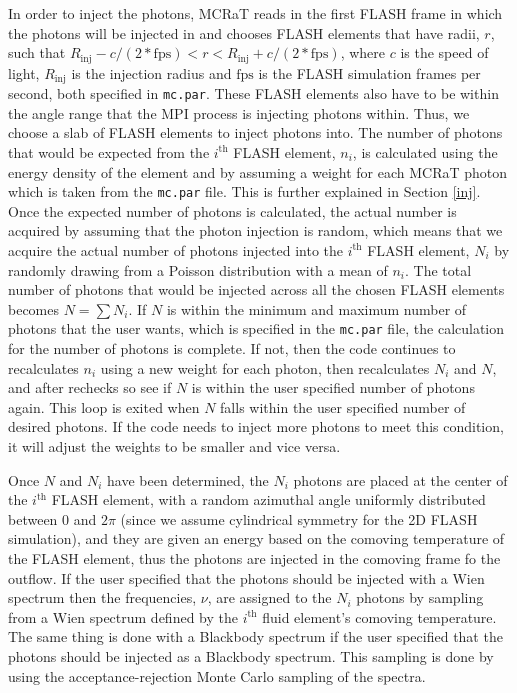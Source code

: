 \documentclass[12pt,a4paper]{article}
\begin{document}
In order to inject the photons, MCRaT reads in the first FLASH frame in which the photons will be injected in and chooses FLASH elements that have radii, $r$, such that $R_\mathrm{inj}-c/(2*\mathrm{fps}) < r < R_\mathrm{inj}+c/(2*\mathrm{fps})$, where $c$ is the speed of light, $R_\mathrm{inj}$ is the injection radius and $\mathrm{fps}$ is the FLASH simulation frames per second, both specified in \texttt{mc.par}. These FLASH elements also have to be within the angle range that the MPI process is injecting photons within. Thus, we choose a slab of FLASH elements to inject photons into. The number of photons that would be expected from the $i^\mathrm{th}$ FLASH element, $n_i$, is calculated using the energy density of the element and by assuming a weight for each MCRaT photon which is taken from the \texttt{mc.par} file. This is further explained in Section \ref{inj}. Once the expected number of photons is calculated, the actual number is acquired by assuming that the photon injection is random, which means that we acquire the actual number of photons injected into the $i^\mathrm{th}$ FLASH element, $N_i$ by randomly drawing from a Poisson distribution with a mean of $n_i$. The total number of photons that would be injected across all the chosen FLASH elements becomes $N=\sum N_i$. If $N$ is within the minimum and maximum number of photons that the user wants, which is specified in the \texttt{mc.par} file, the calculation for the number of photons is complete. If not, then the code continues to recalculates $n_i$ using a new weight for each photon, then recalculates $N_i$ and $N$, and after rechecks so see if $N$ is within the user specified number of photons again. This loop is exited when $N$ falls within the user specified number of desired photons. If the code needs to inject more photons to meet this condition, it will adjust the weights to be smaller and vice versa.

Once $N$ and $N_i$ have been determined, the $N_i$ photons are placed at the center of the $i^\mathrm{th}$ FLASH element, with a random azimuthal angle uniformly distributed between $0$ and $2\pi$ (since we assume cylindrical symmetry for the 2D FLASH simulation), and they are given an energy based on the comoving temperature of the FLASH element, thus the photons are injected in the comoving frame fo the outflow. If the user specified that the photons should be injected with a Wien spectrum then the frequencies, $\nu$, are assigned to the $N_i$ photons by sampling from a Wien spectrum defined by the $i^\mathrm{th}$ fluid element's comoving temperature. The same thing is done with a Blackbody spectrum if the user specified that the photons should be injected as a Blackbody spectrum. This sampling is done by using the acceptance-rejection Monte Carlo sampling of the spectra.
\end{document}
